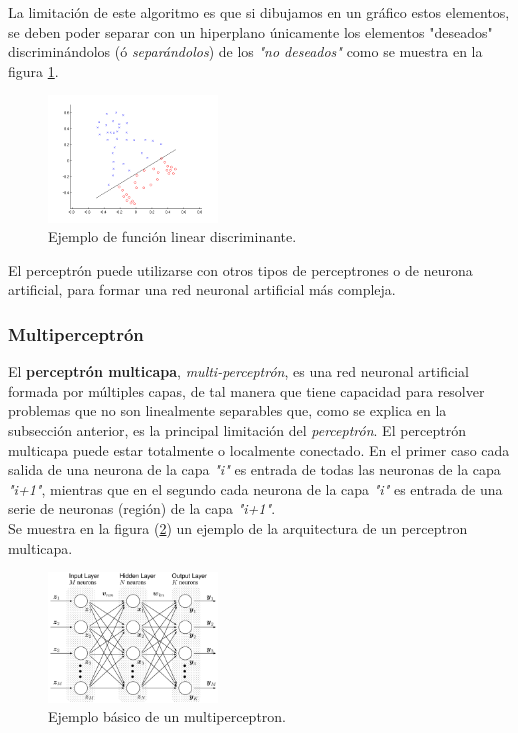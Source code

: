 \documentclass[osajnl,twocolumn,showpacs,superscriptaddress,10pt]{revtex4-1} %
\begin{document}
La limitación de este algoritmo es que si dibujamos en un gráfico estos elementos, se deben poder separar con un hiperplano únicamente los elementos "deseados" discriminándolos (ó \textit{separándolos}) de los \textit{"no deseados"} como se muestra en la figura \ref{figure:linear_example}.

\begin{figure}[H]
    \centering
    \includegraphics[width=0.4\textwidth]{theory/linear}
    \caption{Ejemplo de función linear discriminante.}
    \label{figure:linear_example}
\end{figure}

El perceptrón puede utilizarse con otros tipos de perceptrones o de neurona artificial, para formar una red neuronal artificial más compleja.

\subsubsection{Multiperceptrón}

El \textbf{perceptrón multicapa}, \textit{multi-perceptrón}, es una red neuronal artificial formada por múltiples capas, de tal manera que tiene capacidad para resolver problemas que no son linealmente separables que, como se explica en la subsección anterior, es la principal limitación del \textit{perceptrón}. El perceptrón multicapa puede estar totalmente o localmente conectado. En el primer caso cada salida de una neurona de la capa \textit{"i"} es entrada de todas las neuronas de la capa \textit{"i+1"}, mientras que en el segundo cada neurona de la capa \textit{"i"} es entrada de una serie de neuronas (región) de la capa \textit{"i+1"}. \\

Se muestra en la figura (\ref{figure:multiperceptron_example}) un ejemplo de la arquitectura de un perceptron multicapa.

\begin{figure}[H]
    \centering
    \includegraphics[width=0.4\textwidth]{theory/multiperceptron}
    \caption{Ejemplo básico de un multiperceptron.}
    \label{figure:multiperceptron_example}
\end{figure}
\end{document}
